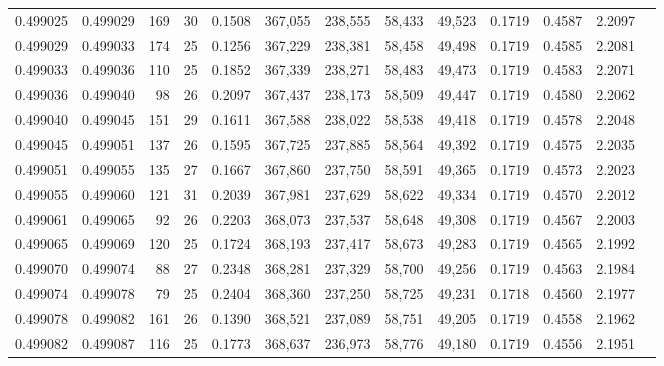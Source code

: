 \begin{tabular}{rrrrrrrrrrrrr}
0.499025 & 0.499029 & 169 &  30 &                                     0.1508 & 367,055 & 238,555 &  58,433 &  49,523 & 0.1719 & 0.4587 & 2.2097 \\
0.499029 & 0.499033 & 174 &  25 &                                     0.1256 & 367,229 & 238,381 &  58,458 &  49,498 & 0.1719 & 0.4585 & 2.2081 \\
0.499033 & 0.499036 & 110 &  25 &                                     0.1852 & 367,339 & 238,271 &  58,483 &  49,473 & 0.1719 & 0.4583 & 2.2071 \\
0.499036 & 0.499040 &  98 &  26 &                                     0.2097 & 367,437 & 238,173 &  58,509 &  49,447 & 0.1719 & 0.4580 & 2.2062 \\
0.499040 & 0.499045 & 151 &  29 &                                     0.1611 & 367,588 & 238,022 &  58,538 &  49,418 & 0.1719 & 0.4578 & 2.2048 \\
0.499045 & 0.499051 & 137 &  26 &                                     0.1595 & 367,725 & 237,885 &  58,564 &  49,392 & 0.1719 & 0.4575 & 2.2035 \\
0.499051 & 0.499055 & 135 &  27 &                                     0.1667 & 367,860 & 237,750 &  58,591 &  49,365 & 0.1719 & 0.4573 & 2.2023 \\
0.499055 & 0.499060 & 121 &  31 &                                     0.2039 & 367,981 & 237,629 &  58,622 &  49,334 & 0.1719 & 0.4570 & 2.2012 \\
0.499061 & 0.499065 &  92 &  26 &                                     0.2203 & 368,073 & 237,537 &  58,648 &  49,308 & 0.1719 & 0.4567 & 2.2003 \\
0.499065 & 0.499069 & 120 &  25 &                                     0.1724 & 368,193 & 237,417 &  58,673 &  49,283 & 0.1719 & 0.4565 & 2.1992 \\
0.499070 & 0.499074 &  88 &  27 &                                     0.2348 & 368,281 & 237,329 &  58,700 &  49,256 & 0.1719 & 0.4563 & 2.1984 \\
0.499074 & 0.499078 &  79 &  25 &                                     0.2404 & 368,360 & 237,250 &  58,725 &  49,231 & 0.1718 & 0.4560 & 2.1977 \\
0.499078 & 0.499082 & 161 &  26 &                                     0.1390 & 368,521 & 237,089 &  58,751 &  49,205 & 0.1719 & 0.4558 & 2.1962 \\
0.499082 & 0.499087 & 116 &  25 &                                     0.1773 & 368,637 & 236,973 &  58,776 &  49,180 & 0.1719 & 0.4556 & 2.1951 \\

\end{tabular}
